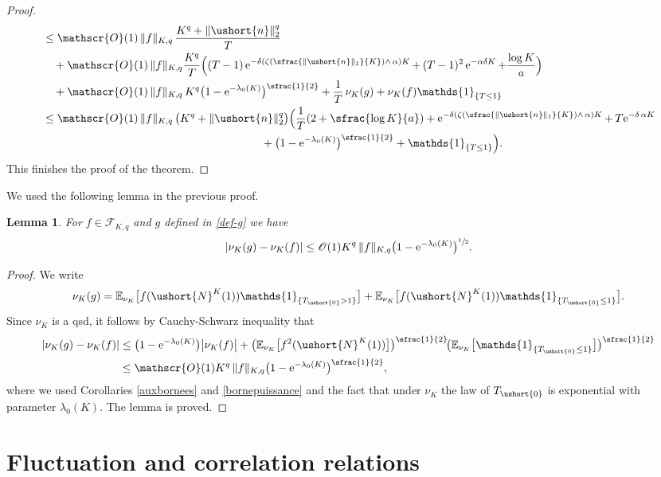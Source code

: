 \documentclass[JEP,XML,SOM,Unicode]{cedram}
\newcommand{\Psfrac}[2]{(\sfrac{#1}{#2})}
\newcommand{\scaleto}[2]{#1}
\let\mathcal\mathscr
\numberwithin{equation}{section}
\theoremstyle{plain}
\newtheorem{lemma}[theorem]{Lemma}
\theoremstyle{definition}
\newcommand{\E}{{\mathbb{E}}}
\newcommand{\Oun}{\mathcal{O}(1)}
\newcommand{\sK}{K}
\newcommand{\un}{\mathds{1}}
\newcommand{\vecn}{\ushort{n}}
\newcommand{\veczer}{\ushort{0}}
\newcommand{\leproc}{\ushort{N}^{K}}
\newcommand{\nuk}{\nu_{K}}\let\snuk\nuk
\newcommand{\e}{\operatorname{e}}
\newcommand{\normdeux}[1]{\|#1\|_{2}}\let\snormdeux\normdeux
\begin{document}
\begin{proof}
\begin{align*}
& \le \Oun\, \|f\|_{\sK,q}\,\frac{K^{q}+\normdeux{\vecn}^{\scaleto{q}{3.6pt}}}{T}\\
& \quad +\Oun\, \|f\|_{\sK,q} \frac{K^q}{T}\Bigl((T-1)\e^{-\delta\left(\zeta\Psfrac{\|\vecn\|_{1}}{K}\wedge\,\alpha\right)K}+\, (T-1)^2\e^{-\alpha\delta K}+\frac{\log K}{a}\Bigr)\\
& \quad + \Oun\, \|f\|_{\sK,q}\, K^q \bigl(1-\e^{-\lambda_0(K)}\bigr)^{\sfrac{1}{2}} + \frac{1}{T}\, \nuk(g) +
\nuk(f)\un_{\{T\leq 1\}}\\
& \leq \Oun\, \|f\|_{\sK,q}\, \bigl(K^{q}+\normdeux{\vecn}^{\scaleto{q}{3.6pt}}\bigr) \Bigl(\frac{1}{T}(2+\sfrac{\log K}{a }) +
\e^{-\delta\left(\zeta\Psfrac{\|\vecn\|_{1}}{K}\wedge\,\alpha\right)K} +\, T\!\e^{-\delta\,\alpha K}\\
& \hspace*{6.9cm} + \bigl(1-\e^{-\lambda_0(K)}\bigr)^{\sfrac{1}{2}} + \un_{\{T\leq 1\}}\Bigr).
\end{align*}
This finishes the proof of the theorem.
\end{proof}

We used the following lemma in the previous proof.
\begin{lemma}
\label{f-et-g}
For $f\in \mathscr{F}\!_{\sK,q}$ and $g$ defined in \eqref{def-g} we have
\[
|\nuk(g)-\nuk(f)|\leq \Oun K^q\, \|f\|_{\sK,q}\bigl(1-\e^{-\lambda_0(K)}\bigr)^{\sfrac{1}{2}}.
\]
\end{lemma}
\begin{proof}
We write
\[
\nuk(g)= \E_{\snuk}\bigl[f(\leproc(1)) \un_{\{T_{\veczer}>1\}}\bigr]
+
\E_{\snuk}\bigl[f(\leproc(1)) \un_{\{T_{\veczer}\leq 1\}}\bigr].
\]
Since $\nuk$ is a qsd, it follows by Cauchy-Schwarz inequality that
\begin{align*}
|\nuk(g)-\nuk(f)|
& \leq \bigl(1-\e^{-\lambda_0(K)}\bigr)\big|\nuk(f)\big|+ \bigl(\E_{\snuk}\bigl[f^2(\leproc(1))\bigr]\bigr)^{\sfrac{1}{2}} \!
\bigl(\E_{\snuk}\bigl[\un_{\{T_{\veczer}\leq 1\}}\bigr] \bigr)^{\sfrac{1}{2}}\\
& \leq\Oun K^q\, \|f\|_{\sK,q} \bigl(1-\e^{-\lambda_0(K)}\bigr)^{\sfrac{1}{2}},
\end{align*}
where we used Corollaries \ref{auxbornees} and \ref{bornepuissance} and the fact that under $\nuk$ the law of $T_{\veczer}
$ is exponential with parameter $\lambda_0(K)$. The lemma is proved.
\end{proof}

\section{Fluctuation and correlation relations}
\label{chaleur}
\end{document}
